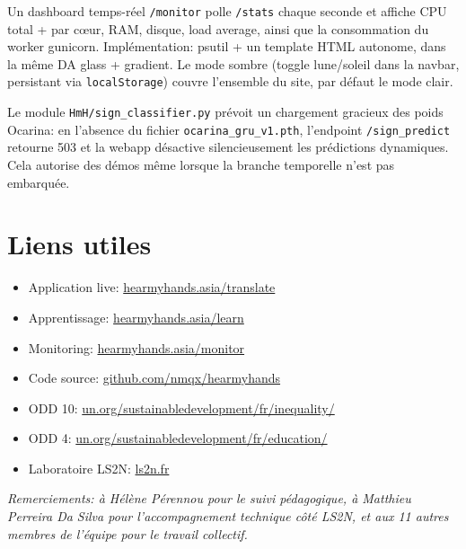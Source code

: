 \documentclass[11pt,a4paper]{article}
\begin{document}
Un dashboard temps-réel \texttt{/monitor} polle \texttt{/stats} chaque seconde et affiche
CPU total + par cœur, RAM, disque, load average, ainsi que la consommation du worker
gunicorn. Implémentation: psutil + un template HTML autonome, dans la même DA glass +
gradient. Le mode sombre (toggle lune/soleil dans la navbar, persistant via
\texttt{localStorage}) couvre l'ensemble du site, par défaut le mode clair.

Le module \texttt{HmH/sign\_classifier.py} prévoit un chargement gracieux des poids
Ocarina: en l'absence du fichier \texttt{ocarina\_gru\_v1.pth}, l'endpoint
\texttt{/sign\_predict} retourne 503 et la webapp désactive silencieusement les
prédictions dynamiques. Cela autorise des démos même lorsque la branche temporelle
n'est pas embarquée.

\section{Liens utiles}

\begin{itemize}[leftmargin=*,itemsep=2pt]
  \item Application live: \href{https://hearmyhands.asia/translate}{hearmyhands.asia/translate}
  \item Apprentissage: \href{https://hearmyhands.asia/learn}{hearmyhands.asia/learn}
  \item Monitoring: \href{https://hearmyhands.asia/monitor}{hearmyhands.asia/monitor}
  \item Code source: \href{https://github.com/nmqx/hearmyhands}{github.com/nmqx/hearmyhands}
  \item ODD 10: \href{https://www.un.org/sustainabledevelopment/fr/inequality/}{un.org/sustainabledevelopment/fr/inequality/}
  \item ODD 4: \href{https://www.un.org/sustainabledevelopment/fr/education/}{un.org/sustainabledevelopment/fr/education/}
  \item Laboratoire LS2N: \href{https://www.ls2n.fr/}{ls2n.fr}
\end{itemize}

\vspace{0.6em}
\noindent\textit{Remerciements: à Hélène Pérennou pour le suivi pédagogique, à Matthieu
Perreira Da Silva pour l'accompagnement technique côté LS2N, et aux 11 autres membres
de l'équipe pour le travail collectif.}
\end{document}
